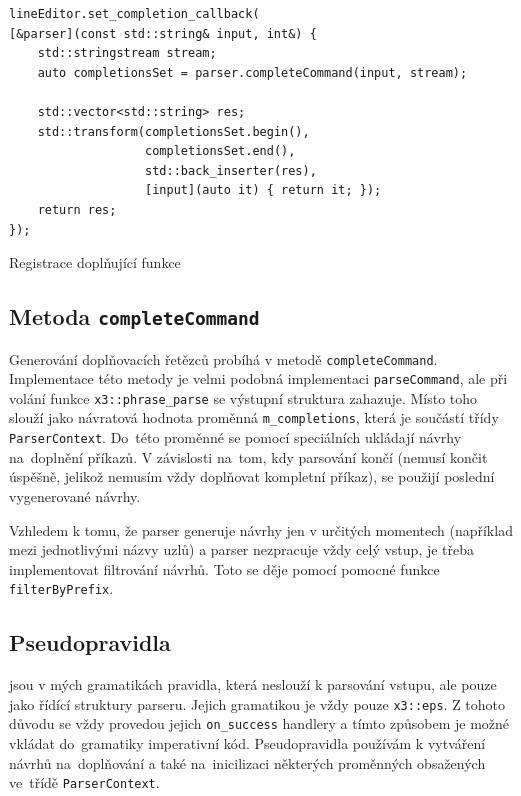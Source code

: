 \documentclass[thesis=B,czech,hidelinks]{FITthesis}[2019/03/06]
\begin{document}
\begin{listing}[H]
\begin{verbatim}
lineEditor.set_completion_callback(
[&parser](const std::string& input, int&) {
    std::stringstream stream;
    auto completionsSet = parser.completeCommand(input, stream);

    std::vector<std::string> res;
    std::transform(completionsSet.begin(),
                   completionsSet.end(),
                   std::back_inserter(res),
                   [input](auto it) { return it; });
    return res;
});
\end{verbatim}
\caption{Registrace doplňující funkce}\label{replxx:callback}
\end{listing}

\subsection{Metoda \texttt{completeCommand}}
Generování doplňovacích řetězců probíhá v metodě \texttt{completeCommand}. Implementace této metody je velmi podobná implementaci \texttt{parseCommand}, ale při volání funkce \texttt{x3::phrase\_parse} se výstupní struktura zahazuje. Místo toho slouží jako návratová hodnota proměnná \texttt{m\_completions}, která je součástí třídy \texttt{ParserContext}. Do~této proměnné se pomocí speciálních  ukládají návrhy na~doplnění příkazů. V závislosti na~tom, kdy parsování končí (nemusí končit úspěšně, jelikož nemusím vždy doplňovat kompletní příkaz), se použijí poslední vygenerované návrhy.

Vzhledem k tomu, že parser generuje návrhy jen v určitých momentech (například mezi jednotlivými názvy uzlů) a parser nezpracuje vždy celý vstup, je třeba implementovat filtrování návrhů. Toto se děje pomocí pomocné funkce \texttt{filterByPrefix}.

\subsection{Pseudopravidla}
 jsou v mých gramatikách pravidla, která neslouží k parsování vstupu, ale pouze jako řídící struktury parseru. Jejich gramatikou je vždy pouze \texttt{x3::eps}. Z tohoto důvodu se vždy provedou jejich \texttt{on\_success} handlery a tímto způsobem je možné vkládat do~gramatiky imperativní kód. Pseudopravidla používám k vytváření návrhů na~doplňování a také na~inicilizaci některých proměnných obsažených ve~třídě \texttt{ParserContext}.
\end{document}
